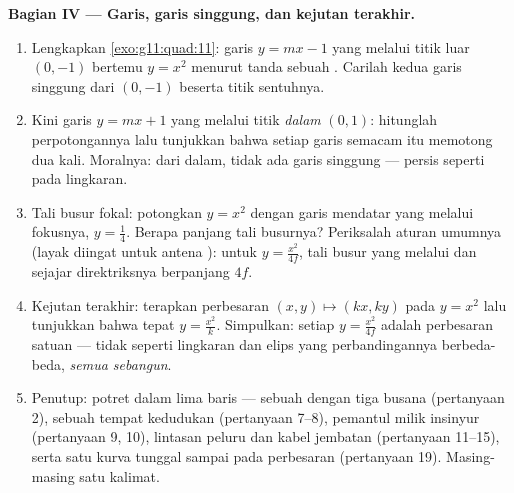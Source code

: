 \begin{problem}
\medskip
\noindent\textbf{Bagian IV --- Garis, garis singgung, dan kejutan
terakhir.}
\begin{enumerate}[resume]
  \item Lengkapkan \cref{exo:g11:quad:11}: garis
        $y = mx - 1$ yang melalui titik luar $(0, -1)$ bertemu
        $y = x^2$ menurut tanda sebuah .
        Carilah kedua garis singgung dari $(0, -1)$ beserta
        titik sentuhnya.
  \item Kini garis $y = mx + 1$ yang melalui titik \emph{dalam}
        $(0, 1)$: hitunglah   perpotongannya lalu
        tunjukkan bahwa setiap garis semacam itu memotong
         dua kali. Moralnya: dari dalam, tidak ada garis
        singgung --- persis seperti pada lingkaran.
  \item Tali busur fokal: potongkan $y = x^2$ dengan
        garis mendatar yang melalui fokusnya, $y = \frac14$. Berapa
        panjang tali busurnya? Periksalah aturan umumnya (layak
        diingat untuk antena ): untuk $y = \frac{x^2}{4f}$,
        tali busur yang melalui  dan sejajar direktriksnya
        berpanjang $4f$.
  \item Kejutan terakhir: terapkan perbesaran
        $(x, y) \mapsto (kx, ky)$ pada  $y = x^2$ lalu
        tunjukkan bahwa  tepat $y = \frac{x^2}{k}$. Simpulkan:
        setiap  $y = \frac{x^2}{4f}$ adalah perbesaran 
        satuan --- tidak seperti lingkaran dan elips yang perbandingannya
        berbeda-beda, \emph{semua  sebangun}.
  \item Penutup: potret  dalam lima baris --- sebuah
         dengan tiga busana (pertanyaan 2), sebuah tempat kedudukan
        (pertanyaan 7--8), pemantul milik insinyur (pertanyaan 9,
        10), lintasan peluru dan kabel jembatan
        (pertanyaan 11--15), serta satu kurva tunggal sampai pada perbesaran
        (pertanyaan 19). Masing-masing satu kalimat.

\end{enumerate}
\end{problem}
